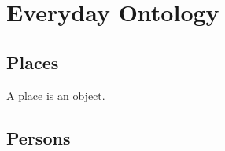 \documentclass{article}
\begin{document}
\section{Everyday Ontology}

\begin{forthel}
\end{forthel}


\subsection{Places}

\begin{forthel}
  \begin{signature*}
    A place is an object.
  \end{signature*}
\end{forthel}


\subsection{Persons}
\end{document}
